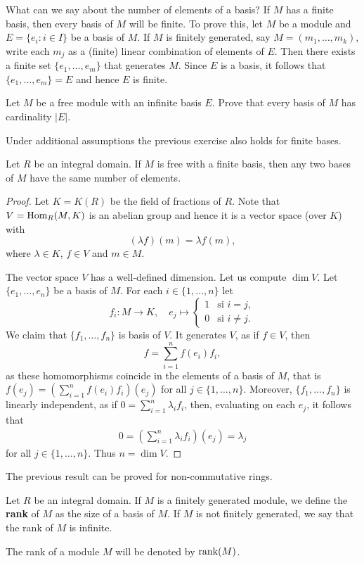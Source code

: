 What can we say about the number of elements of a basis? 
If $M$ has a finite basis, then every basis of $M$ will be finite. To prove
this, let $M$ be a module 
and $E=\{e_i:i\in I\}$ be a basis of $M$. If $M$ is finitely generated, say 
$M=(m_1,\dots,m_k)$, write each $m_j$ as a (finite) linear combination of elements
of $E$. Then there exists 
a finite set $\{e_1,\dots,e_m\}$ that generates $M$. Since 
$E$ is a basis, it follows that
$\{e_1,\dots,e_m\}=E$ and hence $E$ is finite.  

\begin{exercise}
\label{xca:cardinality}
    Let $M$ be a free module with an infinite basis $E$. Prove
    that every basis of $M$ has cardinality $|E|$. 
\end{exercise}

Under additional assumptions the previous exercise also holds for 
finite bases. 

\begin{theorem}
Let $R$ be an integral domain. If $M$ is free with a finite basis, then 
any two bases of $M$ have the same number of elements.
\end{theorem}

\begin{proof}
Let $K=K(R)$ be the field of fractions of $R$. Note that 
$V=\operatorname{Hom}_R(M,K)$ is an abelian group and hence it 
is a vector space (over $K$) with 
\[
(\lambda f)(m)=\lambda f(m),
\]
where $\lambda\in K$, $f\in V$ and $m\in M$.

The vector space $V$ has a well-defined dimension. 
Let us compute $\dim V$. Let $\{e_1,\dots,e_n\}$ be a basis of $M$. 
For each $i\in\{1,\dots,n\}$ let 
\[
f_i\colon M\to K,\quad
e_j\mapsto\begin{cases}
1 & \text{si $i=j$},\\
0 & \text{si $i\ne j$}.
\end{cases}
\]
We claim that $\{f_1,\dots,f_n\}$ is basis of  $V$. It generates $V$, as  
if $f\in V$, then 
\[
f=\sum_{i=1}^n f(e_i)f_i,
\]
as these homomorphisms coincide in the elements of a basis of $M$, that is 
$f(e_j)=(\sum_{i=1}^n f(e_i)f_i)(e_j)$ for all $j\in\{1,\dots,n\}$.    
Moreover, $\{f_1,\dots,f_n\}$ is linearly independent, as if $0=\sum_{i=1}^n\lambda_if_i$, 
then, evaluating on each $e_j$, it follows that 
\begin{align*}
0=\left(\sum_{i=1}^n \lambda_if_i\right)(e_j)=\lambda_j
\end{align*}
for all $j\in\{1,\dots,n\}$. Thus $n=\dim V$. 
\end{proof}

The previous result can be proved for non-commutative rings. 

\begin{definition}
Let $R$ be an integral domain. If $M$ is a finitely generated module, we define
the \textbf{rank} of $M$ as the size of a basis of $M$. If $M$ is not finitely generated, 
we say that the rank of $M$ is infinite. 
\end{definition}

The rank of a module $M$ will be denoted by $\operatorname{rank}(M)$.   
